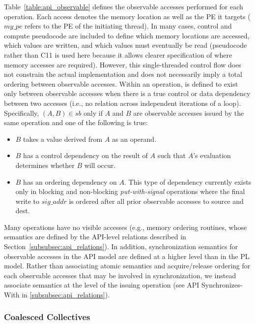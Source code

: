Table~\ref{table:api_observable} defines the observable accesses performed for each
    \openshmem operation. Each access denotes the memory location as well as the \ac{PE}
    it targets ($my\_pe$ refers to the \ac{PE} of the initiating thread).
In many cases, control and compute pseudocode are included to define which memory
    locations are accessed, which values are written, and which values must eventually be
    read (pseudocode rather than C11 is used here because it allows clearer
    specification of where memory accesses are required).
However, this single-threaded control flow does not constrain the actual implementation
    and does not necessarily imply a total \relSB{} ordering between observable
    accesses. Within an operation, \relSB{} is defined to exist only between observable
    accesses when there is a true control or data dependency between two accesses (i.e.,
    no \relSB{} relation across independent iterations of a loop).
Specifically, $(A, B) \in sb$ only if $A$ and $B$ are observable accesses issued by the
    same operation and one of the following is true:
    \begin{itemize}
        \item $B$ takes a value derived from $A$ as an operand.
        \item $B$ has a control dependency on the result of $A$ such that $A$'s
            evaluation determines whether $B$ will occur.
	\item $B$ has an ordering dependency on $A$. This type of dependency currently exists
	    only in blocking and non-blocking \emph{put-with-signal} operations where the final
	    write to $sig\_addr$ is ordered after all prior observable accesses to source and
	    dest.
    \end{itemize} 
Many operations have no visible accesses (e.g., memory ordering routines, whose
    semantics are defined by the API-level relations described in
    Section~\ref{subsubsec:api_relations}).
In addition, synchronization semantics for observable accesses in the API model are
    defined at a higher level than in the PL model. Rather than associating atomic
    semantics and acquire/release ordering for each observable accesses that may be
    involved in synchronization, we instead associate semantics at the level of the
    issuing operation (see API Synchronizes-With in \ref{subsubsec:api_relations}).



\subsubsection{Coalesced Collectives}\label{subsubsec:api_fused}

